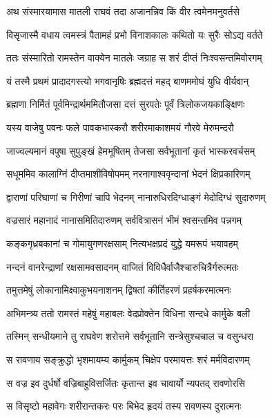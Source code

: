 
\twolineshloka
{अथ संस्मारयामास मातली राघवं तदा}
{अजानन्निव किं वीर त्वमेनमनुवर्तसे} %

\twolineshloka
{विसृजास्मै वधाय त्वमस्त्रं पैतामहं प्रभो}
{विनाशकालः कथितो यः सुरैः सोऽद्य वर्तते} %

\twolineshloka
{ततः संस्मारितो रामस्तेन वाक्येन मातलेः}
{जग्राह स शरं दीप्तं निःश्वसन्तमिवोरगम्} %

\twolineshloka
{यं तस्मै प्रथमं प्रादादगस्त्यो भगवानृषिः}
{ब्रह्मदत्तं महद् बाणममोघं युधि वीर्यवान्} %

\twolineshloka
{ब्रह्मणा निर्मितं पूर्वमिन्द्रार्थममितौजसा}
{दत्तं सुरपतेः पूर्वं त्रिलोकजयकाङ्क्षिणः} %

\twolineshloka
{यस्य वाजेषु पवनः फले पावकभास्करौ}
{शरीरमाकाशमयं गौरवे मेरुमन्दरौ} %

\twolineshloka
{जाज्वल्यमानं वपुषा सुपुङ्खं हेमभूषितम्}
{तेजसा सर्वभूतानां कृतं भास्करवर्चसम्} %

\twolineshloka
{सधूममिव कालाग्निं दीप्तमाशीविषोपमम्}
{नरनागाश्ववृन्दानां भेदनं क्षिप्रकारिणम्} %

\twolineshloka
{द्वाराणां परिघाणां च गिरीणां चापि भेदनम्}
{नानारुधिरदिग्धाङ्गं मेदोदिग्धं सुदारुणम्} %

\twolineshloka
{वज्रसारं महानादं नानासमितिदारुणम्}
{सर्ववित्रासनं भीमं श्वसन्तमिव पन्नगम्} %

\twolineshloka
{कङ्कगृध्रबकानां च गोमायुगणरक्षसाम्}
{नित्यभक्षप्रदं युद्धे यमरूपं भयावहम्} %

\twolineshloka
{नन्दनं वानरेन्द्राणां रक्षसामवसादनम्}
{वाजितं विविधैर्वाजैश्चारुचित्रैर्गरुत्मतः} %

\twolineshloka
{तमुत्तमेषुं लोकानामिक्ष्वाकुभयनाशनम्}
{द्विषतां कीर्तिहरणं प्रहर्षकरमात्मनः} %

\twolineshloka
{अभिमन्त्र्य ततो रामस्तं महेषुं महाबलः}
{वेदप्रोक्तेन विधिना सन्दधे कार्मुके बली} %

\twolineshloka
{तस्मिन् सन्धीयमाने तु राघवेण शरोत्तमे}
{सर्वभूतानि सन्त्रेसुश्चचाल च वसुन्धरा} %

\twolineshloka
{स रावणाय सङ्क्रुद्धो भृशमायम्य कार्मुकम्}
{चिक्षेप परमायत्तः शरं मर्मविदारणम्} %

\twolineshloka
{स वज्र इव दुर्धर्षो वज्रिबाहुविसर्जितः}
{कृतान्त इव चावार्यो न्यपतद् रावणोरसि} %

\twolineshloka
{स विसृष्टो महावेगः शरीरान्तकरः परः}
{बिभेद हृदयं तस्य रावणस्य दुरात्मनः} %

